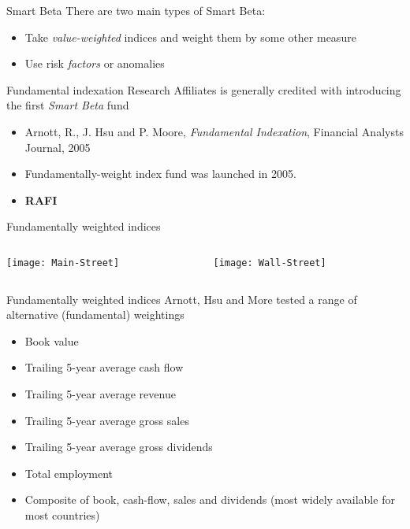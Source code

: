 \documentclass[14pt,xcolor=pdftex,dvipsnames,table]{beamer}\usepackage[]{graphicx}\usepackage[]{color}
\begin{document}
\begin{frame}{Smart Beta}
There are two main types of Smart Beta:
\begin{itemize}[<+-| alert@+>]
\pause
\item Take \emph{value-weighted} indices and weight them by some other measure
\item Use risk \emph{factors} or anomalies 
\end{itemize}
\end{frame}

\begin{frame}{Fundamental indexation}
Research Affiliates is generally credited with introducing the first \emph{Smart Beta} fund 
\begin{itemize}[<+-| alert@+>]
\pause
\item Arnott, R., J. Hsu and P. Moore, \emph{Fundamental Indexation}, Financial Analysts Journal, 2005
\item Fundamentally-weight index fund was launched in 2005. 
\item \textbf{RAFI}
\end{itemize}
\end{frame}

\begin{frame}{Fundamentally weighted indices}
\begin{columns}{}
\begin{column}{0.48\linewidth}
\texttt{[image: Main-Street]}
\end{column}
\begin{column}{0.47\linewidth}
\texttt{[image: Wall-Street]}
\end{column}
\end{columns}
\end{frame}

\begin{frame}{Fundamentally weighted indices}
Arnott, Hsu and More tested a range of alternative (fundamental) weightings
\begin{itemize}[<+-| alert@+>]
\pause
\item Book value
\item Trailing 5-year average cash flow
\item Trailing 5-year average revenue
\item Trailing 5-year average gross sales
\item Trailing 5-year average gross dividends
\item Total employment
\item Composite of book, cash-flow, sales and dividends (most widely available for most countries)
\end{itemize}
\end{frame}
\end{document}
